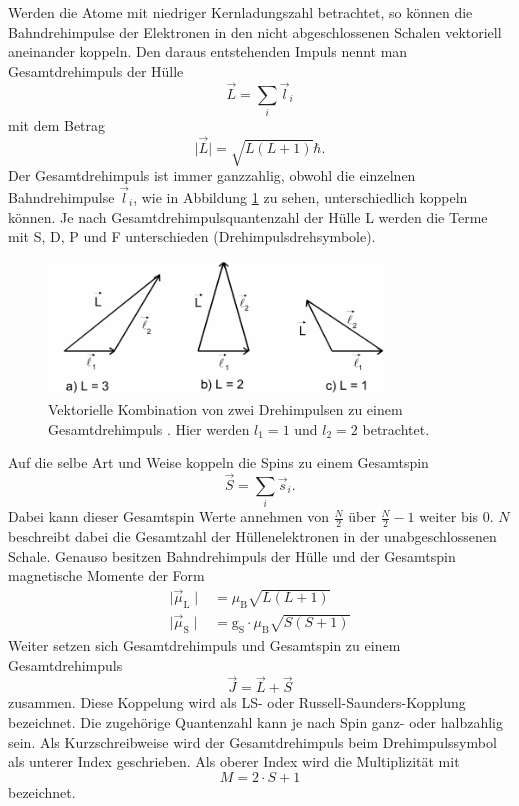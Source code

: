 Werden die Atome mit niedriger Kernladungszahl betrachtet, so können die Bahndrehimpulse
der Elektronen in den nicht abgeschlossenen Schalen vektoriell aneinander koppeln.
Den daraus entstehenden Impuls nennt man Gesamtdrehimpuls der Hülle
\begin{equation}
  \vec{L} = \sum_i \vec{l}_i
  \label{eqn:gesamtbahndrehimpuls}
\end{equation}
mit dem Betrag
\begin{equation}
  \mid\vec{L}\mid = \sqrt{L\left(L+1 \right)} \hbar.
  \label{eqn:betraggesamtdrehipuls}
\end{equation}
Der Gesamtdrehimpuls ist immer ganzzahlig, obwohl die einzelnen Bahndrehimpulse $\vec{l}_i$,
wie in Abbildung \ref{abb:drehimpulse} zu sehen, unterschiedlich koppeln können.
Je nach Gesamtdrehimpulsquantenzahl der Hülle L werden die Terme mit S, D, P und F
unterschieden (Drehimpulsdrehsymbole).
\begin{figure}[htb]
  \centering
  \includegraphics[width=0.8\textwidth]{images/V27.pdf}
  \caption{Vektorielle Kombination von zwei Drehimpulsen zu einem Gesamtdrehimpuls
  \cite{anleitung}. Hier werden $l_1 = 1$ und $l_2 = 2$ betrachtet.}
  \label{abb:drehimpulse}
\end{figure}
Auf die selbe Art und Weise koppeln die Spins zu einem Gesamtspin
\begin{equation}
  \vec{S} = \sum_i \vec{s}_i.
  \label{eqn:gesamtspin}
\end{equation}
Dabei kann dieser Gesamtspin Werte annehmen von $\frac{N}{2}$ über $\frac{N}{2}-1$
weiter bis $\num{0}$. $N$ beschreibt dabei die Gesamtzahl der Hüllenelektronen in
der unabgeschlossenen Schale.
Genauso besitzen Bahndrehimpuls der Hülle und der Gesamtspin magnetische Momente
der Form
\begin{align}
  \mid \vec{\mu}_\text{L} \mid &= \mu_\text{B} \sqrt{L\left(L+1 \right)} \\
  \mid \vec{\mu}_\text{S} \mid &= \text{g}_\text{S}\cdot \mu_\text{B} \sqrt{S\left(S+1 \right)}
  \label{eqn:gesamtmomente}
\end{align}
Weiter setzen sich Gesamtdrehimpuls und Gesamtspin zu einem Gesamtdrehimpuls
\begin{equation}
  \vec{J} = \vec{L} + \vec{S}
  \label{eqn:gesamtdrehimpuls}
\end{equation}
zusammen. Diese Koppelung wird als LS- oder Russell-Saunders-Kopplung bezeichnet.
Die zugehörige Quantenzahl kann je nach Spin ganz- oder halbzahlig sein. Als
Kurzschreibweise wird der Gesamtdrehimpuls beim Drehimpulssymbol als unterer Index
geschrieben. Als oberer Index wird die Multiplizität mit
\begin{equation}
  M = 2\cdot S + 1
\end{equation}
bezeichnet.

